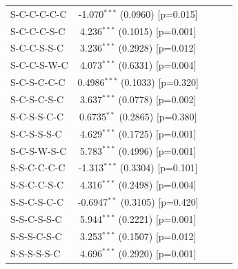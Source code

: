 \begin{table}[H]
\begin{tabular}{lcccc}
      S-C-C-C-C-C                     & -1.070$^{***}$ (0.0960) [p=0.015]  &                        &                        &   \\   
      S-C-C-C-S-C                     & 4.236$^{***}$ (0.1015) [p=0.001]   &                        &                        &   \\   
      S-C-C-S-S-C                     & 3.236$^{***}$ (0.2928) [p=0.012]   &                        &                        &   \\   
      S-C-C-S-W-C                     & 4.073$^{***}$ (0.6331) [p=0.004]   &                        &                        &   \\   
      S-C-S-C-C-C                     & 0.4986$^{***}$ (0.1033) [p=0.320]  &                        &                        &   \\   
      S-C-S-C-S-C                     & 3.637$^{***}$ (0.0778) [p=0.002]   &                        &                        &   \\   
      S-C-S-S-C-C                     & 0.6735$^{**}$ (0.2865) [p=0.380]   &                        &                        &   \\   
      S-C-S-S-S-C                     & 4.629$^{***}$ (0.1725) [p=0.001]   &                        &                        &   \\   
      S-C-S-W-S-C                     & 5.783$^{***}$ (0.4996) [p=0.001]   &                        &                        &   \\   
      S-S-C-C-C-C                     & -1.313$^{***}$ (0.3304) [p=0.101]  &                        &                        &   \\   
      S-S-C-C-S-C                     & 4.316$^{***}$ (0.2498) [p=0.004]   &                        &                        &   \\   
      S-S-C-S-C-C                     & -0.6947$^{**}$ (0.3105) [p=0.420]  &                        &                        &   \\   
      S-S-C-S-S-C                     & 5.944$^{***}$ (0.2221) [p=0.001]   &                        &                        &   \\   
      S-S-S-C-S-C                     & 3.253$^{***}$ (0.1507) [p=0.012]   &                        &                        &   \\   
      S-S-S-S-S-C                     & 4.696$^{***}$ (0.2920) [p=0.001]   &                        &                        &   \\   

\end{tabular}
\end{table}
